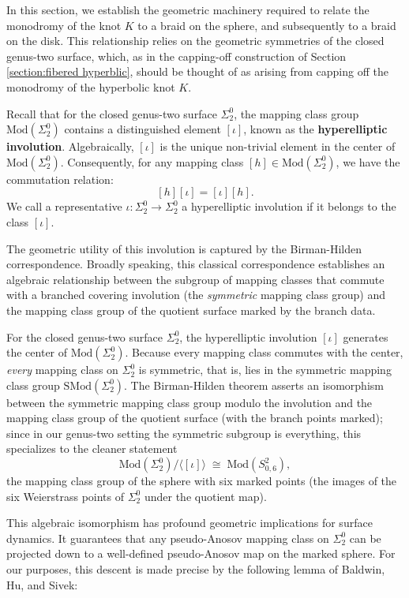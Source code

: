 In this section, we establish the geometric machinery required to relate the monodromy of the knot $K$ to a braid on the sphere, and subsequently to a braid on the disk. This relationship relies on the geometric symmetries of the closed genus-two surface, which, as in the capping-off construction of Section \ref{section:fibered hyperblic}, should be thought of as arising from capping off the monodromy of the hyperbolic knot $K$.

Recall that for the closed genus-two surface $\Sigma_2^0$, the mapping class group $\mathrm{Mod}(\Sigma_2^0)$ contains a distinguished element $[\iota]$, known as the \textbf{hyperelliptic involution}. Algebraically, $[\iota]$ is the unique non-trivial element in the center of $\mathrm{Mod}(\Sigma_2^0)$. Consequently, for any mapping class $[h] \in \mathrm{Mod}(\Sigma_2^0)$, we have the commutation relation:
\begin{equation}\label{equation:symmetric hyperelliptic involution}
    [h][\iota] = [\iota][h].
\end{equation}
We call a representative $\iota \colon \Sigma_2^0 \to \Sigma_2^0$ a hyperelliptic involution if it belongs to the class $[\iota]$.

The geometric utility of this involution is captured by the Birman-Hilden correspondence. Broadly speaking, this classical correspondence establishes an algebraic relationship between the subgroup of mapping classes that commute with a branched covering involution (the \textit{symmetric} mapping class group) and the mapping class group of the quotient surface marked by the branch data.

For the closed genus-two surface $\Sigma_2^0$, the hyperelliptic involution $[\iota]$ generates the center of $\mathrm{Mod}(\Sigma_2^0)$. Because every mapping class commutes with the center, \emph{every} mapping class on $\Sigma_2^0$ is symmetric, that is, lies in the symmetric mapping class group $\mathrm{SMod}(\Sigma_2^0)$. The Birman-Hilden theorem asserts an isomorphism between the symmetric mapping class group modulo the involution and the mapping class group of the quotient surface (with the branch points marked); since in our genus-two setting the symmetric subgroup is everything, this specializes to the cleaner statement
\[
\mathrm{Mod}(\Sigma_2^0) / \langle [\iota] \rangle \;\cong\; \mathrm{Mod}(S^2_{0,6}),
\]
the mapping class group of the sphere with six marked points (the images of the six Weierstrass points of $\Sigma_2^0$ under the quotient map).

This algebraic isomorphism has profound geometric implications for surface dynamics. It guarantees that any pseudo-Anosov mapping class on $\Sigma_2^0$ can be projected down to a well-defined pseudo-Anosov map on the marked sphere. For our purposes, this descent is made precise by the following lemma of Baldwin, Hu, and Sivek:

